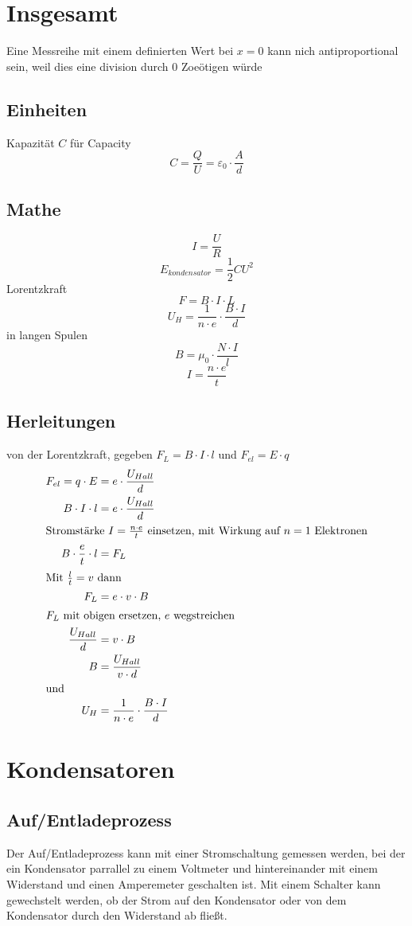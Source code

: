 \documentclass{article}\usepackage[a4paper]{geometry}
\begin{document}
 
\section{Insgesamt}
Eine Messreihe mit einem definierten Wert bei $x=0$ kann nich antiproportional sein, weil dies eine division durch 0 Zoeötigen würde 
 
\subsection{Einheiten}
\noindent Kapazität $C$ für Capacity
\[C=\frac{Q}{U}=\varepsilon_0 \cdot \frac{A}{d}\]
 
\subsection{Mathe} 
\[I=\frac{U}{R}\]
\[E_{kondensator}=\frac{1}{2}CU^2\]
Lorentzkraft 
\[F=B \cdot I \cdot L\] 
\[U_H=\frac{1}{n \cdot e} \cdot \frac{B \cdot I}{d}\]
in langen Spulen 
\[B=\mu_0 \cdot \frac{N \cdot I}{l}\]
\[I = \frac{n \cdot e}{t}\] 
 
\subsection{Herleitungen}
von der Lorentzkraft, gegeben $F_L=B \cdot I \cdot l$ und $F_{el} = E \cdot q$ 
\begin{align}
F_{el} = q \cdot E &= e \cdot \frac{U_{Hall}}{d} \\
B \cdot I \cdot l &= e \cdot \frac{U_{Hall}}{d} \\
\intertext{Stromstärke $I = \frac{n \cdot e}{t}$ einsetzen, mit Wirkung auf $n=1$ Elektronen}
B \cdot \frac{e}{t} \cdot l &= F_L \\
\intertext{Mit $\frac{l}{t} = v$ dann}
F_L &= e \cdot v \cdot B \\
\intertext{$F_L$ mit obigen ersetzen, $e$ wegstreichen}
\frac{U_{Hall}}{d} &= v \cdot B \\
B &= \frac{U_{Hall}}{v \cdot d} \\
\intertext{und}
U_H &= \frac{1}{n \cdot e} \cdot \frac{B \cdot I}{d} 
\end{align} 
 
\section{Kondensatoren}  
\subsection{Auf/Entladeprozess}
Der Auf/Entladeprozess kann mit einer Stromschaltung gemessen werden, bei der ein Kondensator parrallel zu einem Voltmeter und hintereinander mit einem Widerstand und einen Amperemeter geschalten ist. Mit einem Schalter kann gewechstelt werden, ob der Strom auf den Kondensator oder von dem Kondensator durch den Widerstand ab fließt. 
 
\end{document}

